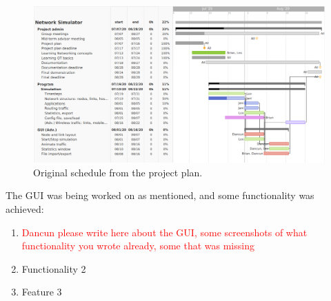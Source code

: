 \begin{figure}[!htbp]
\begin{center}
	\includegraphics[width=13cm]{originalschedule.png}
    \caption{Original schedule from the project plan.}
	\label{img:schedule}			%
\end{center}
\end{figure}

The GUI was being worked on as mentioned, and some functionality was achieved:
\begin{enumerate}
    \item \textcolor{red}{Dancun please write here about the GUI, some screenshots of what functionality you wrote already, some that was missing}
    \item Functionality 2
    \item Feature 3
\end{enumerate}
